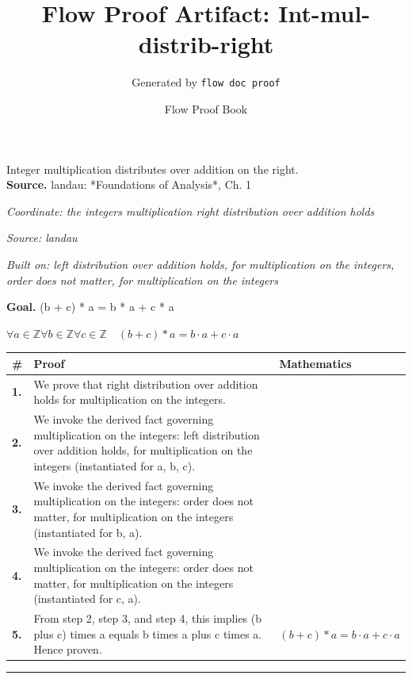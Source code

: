 \documentclass[11pt]{article}
\title{Flow Proof Artifact: Int-mul-distrib-right}
\author{Generated by \texttt{flow doc proof}}
\date{Flow Proof Book}
\theoremstyle{definition}
\begin{document}
\maketitle
Integer multiplication distributes over addition on the right.\\[0.5em]
\textbf{Source.} landau: *Foundations of Analysis*, Ch. 1\\[0.5em]
\bigskip
{}\par
\smallskip\noindent\textit{Coordinate: the integers \cdot multiplication \cdot right distribution over addition holds}\par
\smallskip\noindent\textit{Source: landau}\par
\smallskip\noindent\textit{Built on: left distribution over addition holds, for multiplication on the integers, order does not matter, for multiplication on the integers}\par
\medskip
\noindent\textbf{Goal.} (b + c) * a = b * a + c * a\par
\noindent$\displaystyle \forall a \in \mathbb{Z} \forall b \in \mathbb{Z} \forall c \in \mathbb{Z}\quad (b + c) * a = b \cdot a + c \cdot a$\par
\medskip
\noindent
\begin{tabular}{@{} >{\raggedright\arraybackslash}p{} >{\raggedright\arraybackslash}p{} >{\raggedleft\arraybackslash}p{} @{}}
\textbf{\#} & \textbf{Proof} & \textbf{Mathematics} \\
\midrule
\textbf{1.} & We prove that right distribution over addition holds for multiplication on the integers. & \\[0.45em]
\textbf{2.} & We invoke the derived fact governing multiplication on the integers: left distribution over addition holds, for multiplication on the integers (instantiated for a, b, c). & \\[0.45em]
\textbf{3.} & We invoke the derived fact governing multiplication on the integers: order does not matter, for multiplication on the integers (instantiated for b, a). & \\[0.45em]
\textbf{4.} & We invoke the derived fact governing multiplication on the integers: order does not matter, for multiplication on the integers (instantiated for c, a). & \\[0.45em]
\textbf{5.} & From step 2, step 3, and step 4, this implies (b plus c) times a equals b times a plus c times a. Hence proven. & $\displaystyle (b + c) * a = b \cdot a + c \cdot a$ \\[0.45em]
\bottomrule
\end{tabular}
\label{thm:Int-multiplication-right_distribution_over_addition_holds}
\par\medskip\hrule
\end{document}

